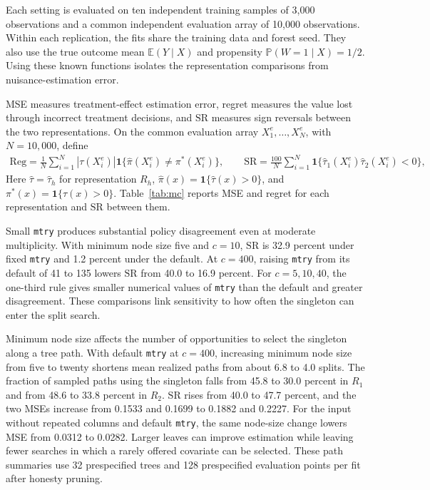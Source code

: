 \documentclass[12pt]{article}
\newcommand{\E}{\mathbb E}
\newcommand{\Prb}{\mathbb P}
\newcommand{\one}{\mathbf 1}
\begin{document}
Each setting is evaluated on ten independent training samples of 3,000 observations and a common independent evaluation array of 10,000 observations. Within each replication, the fits share the training data and forest seed. They also use the true outcome mean \(\E(Y\mid X)\) and propensity \(\Prb(W=1\mid X)=1/2\). Using these known functions isolates the representation comparisons from nuisance-estimation error.

MSE measures treatment-effect estimation error, regret measures the value lost through incorrect treatment decisions, and \(\mathrm{SR}\) measures sign reversals between the two representations. On the common evaluation array \(X_1^e,\ldots,X_N^e\), with \(N=10{,}000\), define
\[
\begin{aligned}
\mathrm{Reg}=\frac1N\sum_{i=1}^N|\tau(X_i^e)|
 \one\{\widehat\pi(X_i^e)\ne\pi^*(X_i^e)\},\qquad
\mathrm{SR}=\frac{100}{N}\sum_{i=1}^N
 \one\{\widehat\tau_1(X_i^e)\widehat\tau_2(X_i^e)<0\},
\end{aligned}
\]
Here \(\widehat\tau=\widehat\tau_h\) for representation \(R_h\), \(\widehat\pi(x)=\one\{\widehat\tau(x)>0\}\), and \(\pi^*(x)=\one\{\tau(x)>0\}\). Table~\ref{tab:mc} reports MSE and regret for each representation and \(\mathrm{SR}\) between them.

Small \texttt{mtry} produces substantial policy disagreement even at moderate multiplicity. With minimum node size five and \(c=10\), \(\mathrm{SR}\) is 32.9 percent under fixed \texttt{mtry} and 1.2 percent under the default. At \(c=400\), raising \texttt{mtry} from its default of 41 to 135 lowers \(\mathrm{SR}\) from 40.0 to 16.9 percent. For \(c=5,10,40\), the one-third rule gives smaller numerical values of \texttt{mtry} than the default and greater disagreement. These comparisons link sensitivity to how often the singleton can enter the split search.

Minimum node size affects the number of opportunities to select the singleton along a tree path. With default \texttt{mtry} at \(c=400\), increasing minimum node size from five to twenty shortens mean realized paths from about 6.8 to 4.0 splits. The fraction of sampled paths using the singleton falls from 45.8 to 30.0 percent in \(R_1\) and from 48.6 to 33.8 percent in \(R_2\). \(\mathrm{SR}\) rises from 40.0 to 47.7 percent, and the two MSEs increase from 0.1533 and 0.1699 to 0.1882 and 0.2227. For the input without repeated columns and default \texttt{mtry}, the same node-size change lowers MSE from 0.0312 to 0.0282. Larger leaves can improve estimation while leaving fewer searches in which a rarely offered covariate can be selected. These path summaries use 32 prespecified trees and 128 prespecified evaluation points per fit after honesty pruning.
\end{document}
